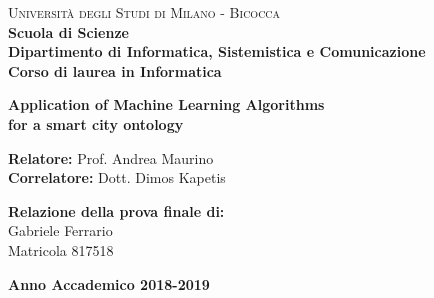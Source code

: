         
        \noindent
        \begin{minipage}[t]{0.19\textwidth}
        \end{minipage}
        \begin{minipage}[t]{0.81\textwidth}
        {
                {\textsc{Università degli Studi di Milano - Bicocca}} \\
                \textbf{Scuola di Scienze} \\
                \textbf{Dipartimento di Informatica, Sistemistica e Comunicazione} \\
                \textbf{Corso di laurea in Informatica} \\
                \par
        }
        \end{minipage}
        
	\vspace{40mm}
        
	\begin{center}
            {\LARGE{
                    \textbf{Application of Machine Learning Algorithms \\ for a smart city ontology}
                    \par
            }}
        \end{center}
        
        \vspace{50mm}

        \noindent
        {\large \textbf{Relatore:} Prof. Andrea Maurino } \\

        \noindent
        {\large \textbf{Correlatore:} Dott. Dimos Kapetis}
        
        \vspace{15mm}

        \begin{flushright}
            {\large \textbf{Relazione della prova finale di:}} \\
            \large{Gabriele Ferrario} \\
            \large{Matricola 817518} 
        \end{flushright}
        
        \vspace{40mm}
        \begin{center}
            {\large{\bf Anno Accademico 2018-2019}}
        \end{center}

        \restoregeometry
        
